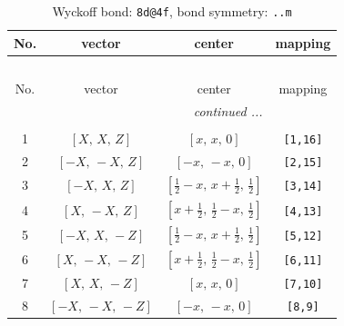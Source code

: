 \documentclass[fleqn,8pt]{jsarticle}
\begin{document}
\begin{longtable}{cccc}
\caption{Wyckoff bond: {\tt 8d@4f}, bond symmetry: {\tt ..m}}
 \\
 \hline \hline
No. & vector & center & mapping \\ \hline \endfirsthead

\multicolumn{3}{l}{\tablename\ \thetable{}} \\
 \hline \hline
No. & vector & center & mapping \\ \hline \endhead

 \hline \hline
\multicolumn{3}{r}{\footnotesize\it continued ...} \\ \endfoot

 \hline \hline
\multicolumn{3}{r}{} \\ \endlastfoot

1 & $\left[ X,\, X,\, Z \right]$ & $\left[ x,\, x,\, 0 \right]$ & {\tt [1,16]} \\ \hline
2 & $\left[ - X,\, - X,\, Z \right]$ & $\left[ - x,\, - x,\, 0 \right]$ & {\tt [2,15]} \\ \hline
3 & $\left[ - X,\, X,\, Z \right]$ & $\left[ \frac{1}{2} - x,\, x + \frac{1}{2},\, \frac{1}{2} \right]$ & {\tt [3,14]} \\ \hline
4 & $\left[ X,\, - X,\, Z \right]$ & $\left[ x + \frac{1}{2},\, \frac{1}{2} - x,\, \frac{1}{2} \right]$ & {\tt [4,13]} \\ \hline
5 & $\left[ - X,\, X,\, - Z \right]$ & $\left[ \frac{1}{2} - x,\, x + \frac{1}{2},\, \frac{1}{2} \right]$ & {\tt [5,12]} \\ \hline
6 & $\left[ X,\, - X,\, - Z \right]$ & $\left[ x + \frac{1}{2},\, \frac{1}{2} - x,\, \frac{1}{2} \right]$ & {\tt [6,11]} \\ \hline
7 & $\left[ X,\, X,\, - Z \right]$ & $\left[ x,\, x,\, 0 \right]$ & {\tt [7,10]} \\ \hline
8 & $\left[ - X,\, - X,\, - Z \right]$ & $\left[ - x,\, - x,\, 0 \right]$ & {\tt [8,9]} \\
\end{longtable}
\renewcommand{\arraystretch}{1.2}
\end{document}
